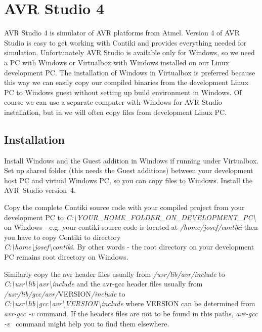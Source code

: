 \documentclass{article}
\begin{document}
{{%

\section{AVR Studio 4}
AVR Studio 4 is simulator of AVR platforms from Atmel.
Version 4 of AVR Studio is easy to get working with Contiki and provides everything needed for simulation.
Unfortunately AVR Studio is available only for Windows,
so we need a PC with Windows or Virtualbox with Windows installed on our Linux development PC.
The installation of Windows in Virtualbox is preferred because this way we can easily copy our compiled binaries
from the development Linux PC to Windows guest
without setting up build environment in Windows.
Of course we can use a separate computer with Windows for AVR Studio installation,
but in we will often copy files from development Linux PC.

\subsection{Installation}
Install Windows and the Guest addition in Windows if running under Virtualbox.
Set up shared folder (this needs the Guest additions) between your development host PC and virtual Windows PC, so you can copy files to Windows.
Install the AVR~Studio version~4.

Copy the complete Contiki source code with your compiled project from your development PC to
{\it{C:\textbackslash YOUR\_HOME\_FOLDER\_ON\_DEVELOPMENT\_PC\textbackslash}}
on Windows - e.g. your contiki source code is located at {\it{/home/josef/contiki}}
then you have to copy Contiki to directory \\
{\it{C:\textbackslash home\textbackslash josef\textbackslash contiki}}.
By other words - the root directory on your development PC remains root directory on Windows.

Similarly copy the avr header files usually from {\it{/usr/lib/avr/include}} to
{\it{C:\textbackslash usr\textbackslash lib\textbackslash avr\textbackslash include}}
and the avr-gcc header files usually from {\it{/usr/lib/gcc/avr/}}VERSION{\it{/include}} to \\
{\it{C:\textbackslash usr\textbackslash lib\textbackslash gcc\textbackslash avr\textbackslash VERSION\textbackslash include}}
where VERSION can be determined from {\it{avr-gcc -v}} command.
If the headers files are not to be found in this paths, {\it{avr-gcc -v }} command might help you to find them elsewhere.

}}
\end{document}
